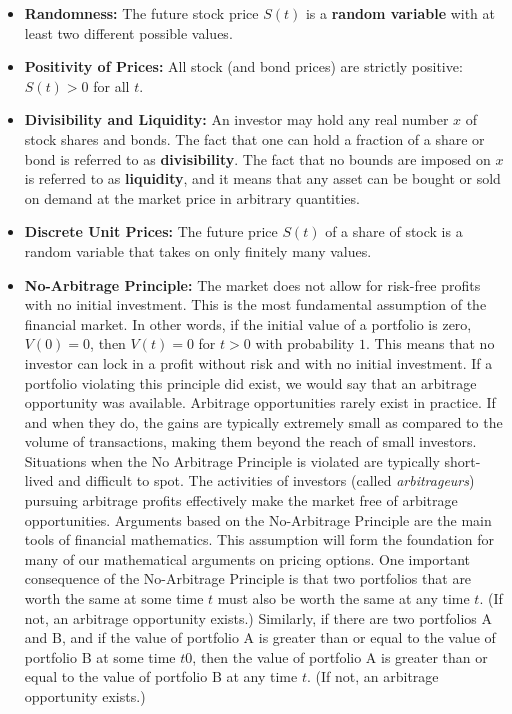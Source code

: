 \documentclass[letterpaper,10pt]{article}
\begin{document}
\begin{itemize}

\item {\bf Randomness:} The future stock price $S(t)$ is a {\bf random variable} with at least two different possible values.  

\item {\bf Positivity of Prices:} All stock (and bond prices) are strictly positive:  $S(t)>0$ for all $t$.





\item {\bf Divisibility and Liquidity:} An investor may hold any real number $x$ of stock shares and bonds.
The fact that one can hold a fraction of a share or bond is referred to as {\bf divisibility}.  The fact that no bounds are imposed on $x$ is referred to as {\bf liquidity}, and it means that any asset can be bought or sold on demand at the market price in arbitrary quantities.  



\item {\bf Discrete Unit Prices:} The future price $S(t)$ of a share of stock is a random variable that takes on only finitely many values.



\item {\bf No-Arbitrage Principle:} The market does not allow for risk-free profits with no initial investment.  This is the most fundamental assumption of the financial market.  In other words, if the initial value of a portfolio is zero, $V (0) = 0$, then $V (t) = 0$ for $t>0$ with probability $1$. This means that no investor can lock in a profit without risk and with no initial investment. If a portfolio violating this principle did exist, we would say that an arbitrage opportunity was available.  Arbitrage opportunities rarely exist in practice. If and when they do, the gains are typically extremely small as compared to the volume of transactions, making them beyond the reach of small investors. Situations when the No Arbitrage Principle is violated are typically short-lived and difficult to spot. The activities of investors (called {\em arbitrageurs}) pursuing arbitrage profits effectively make the market free of arbitrage opportunities.  Arguments based on the No-Arbitrage Principle are the main tools of financial mathematics.  This assumption will form the foundation for many of our mathematical arguments on pricing options.  One important consequence of the No-Arbitrage Principle is that two portfolios that are worth the same at some time $t$ must also be worth the same at any time $t$.  (If not, an arbitrage opportunity exists.)  Similarly, if there are two portfolios A and B, and if the value of portfolio A is greater than or equal to the value of portfolio B at some time $t0$, then the value of portfolio A is greater than or equal to the value of portfolio B at any time $t$. (If not, an arbitrage opportunity exists.)




\end{itemize}
\end{document}
